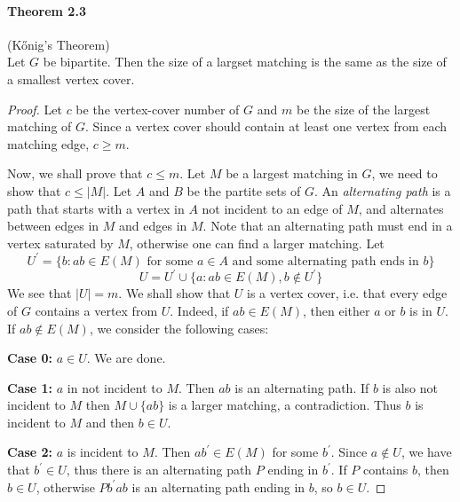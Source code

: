 \paragraph{Theorem 2.3} (K\H{o}nig's Theorem) \\
Let $ G $ be bipartite. Then the size of a largset matching is the same as the 
size of a smallest vertex cover.
\begin{proof}
   Let $ c $ be the vertex-cover number of $ G $ and $ m $ be the size of the 
   largest matching of $ G$. Since a vertex cover should contain at least one 
   vertex from each matching edge, $ c \geq m $. 

   \smallskip \noindent
   Now, we shall prove that $ c \leq m$. Let $ M $ be a largest matching in $ G $,
   we need to show that $ c \leq |M|$. Let $ A $ and $ B $ be the partite sets of $ G$.
   An \textit{alternating path} is a path that starts with a vertex in $ A $ not incident
   to an edge of $ M $, and alternates between edges in $ M $ and edges in $ M$.
   Note that an alternating path must end in a vertex saturated by $ M $, otherwise one 
   can find a larger matching. Let 
   $$ U^\prime = \{b: ab \in E(M) \text{ for some } a \in A 
   \text{ and some alternating path ends in } b\} $$
   $$ U = U^\prime \cup \{a: ab \in E(M), b \notin U^\prime\} $$
   We see that $ |U| = m$. We shall show that $ U $ is a vertex cover, i.e. that every
   edge of $ G $ contains a vertex from $ U$. Indeed, if $ ab \in E(M) $, then either 
   $ a $ or $ b $ is in $ U $. If $ ab \notin E(M) $, we consider the following cases:

   \bigskip \noindent
   \textbf{Case 0:} $ a \in U $. We are done.

   \smallskip \noindent
   \textbf{Case 1:} $ a $ in not incident to $ M$. Then $ ab $ is an alternating path.
   If $ b $ is also not incident to $ M $ then $ M \cup \{ab\} $ is a larger matching, 
   a contradiction. Thus $ b $ is incident to $ M $ and then $ b \in U $.

   \smallskip \noindent
   \textbf{Case 2:} $ a $ is incident to $ M$. Then $ ab^\prime \in E(M) $ for some 
   $ b^\prime$. Since $ a \notin U$, we have that $ b^\prime \in U$, thus there is 
   an alternating path $ P $ ending in $ b^\prime$. If $ P $ contains $ b$, then 
   $ b \in U$, otherwise $ Pb^{\prime}ab $ is an alternating path ending in  
   $ b $, so $ b \in U$.

\end{proof}

